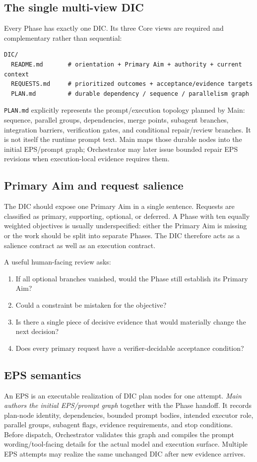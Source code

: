 \documentclass[11pt,a4paper]{article}
\begin{document}
\subsection{The single multi-view DIC}
Every Phase has exactly one DIC. Its three Core views are required and complementary rather than sequential:
\begin{lstlisting}[style=workflow]
DIC/
  README.md       # orientation + Primary Aim + authority + current context
  REQUESTS.md     # prioritized outcomes + acceptance/evidence targets
  PLAN.md         # durable dependency / sequence / parallelism graph
\end{lstlisting}
\texttt{PLAN.md} explicitly represents the prompt/execution topology planned by Main: sequence, parallel groups, dependencies, merge points, subagent branches, integration barriers, verification gates, and conditional repair/review branches. It is not itself the runtime prompt text. Main maps those durable nodes into the initial EPS/prompt graph; Orchestrator may later issue bounded repair EPS revisions when execution-local evidence requires them.

\subsection{Primary Aim and request salience}
The DIC should expose one Primary Aim in a single sentence. Requests are classified as primary, supporting, optional, or deferred. A Phase with ten equally weighted objectives is usually underspecified: either the Primary Aim is missing or the work should be split into separate Phases. The DIC therefore acts as a salience contract as well as an execution contract.

A useful human-facing review asks:
\begin{enumerate}
\item If all optional branches vanished, would the Phase still establish its Primary Aim?
\item Could a constraint be mistaken for the objective?
\item Is there a single piece of decisive evidence that would materially change the next decision?
\item Does every primary request have a verifier-decidable acceptance condition?
\end{enumerate}

\subsection{EPS semantics}
An EPS is an executable realization of DIC plan nodes for one attempt. \emph{Main authors the initial EPS/prompt graph} together with the Phase handoff. It records plan-node identity, dependencies, bounded prompt bodies, intended executor role, parallel groups, subagent flags, evidence requirements, and stop conditions. Before dispatch, Orchestrator validates this graph and compiles the prompt wording/tool-facing details for the actual model and execution surface. Multiple EPS attempts may realize the same unchanged DIC after new evidence arrives.
\end{document}
